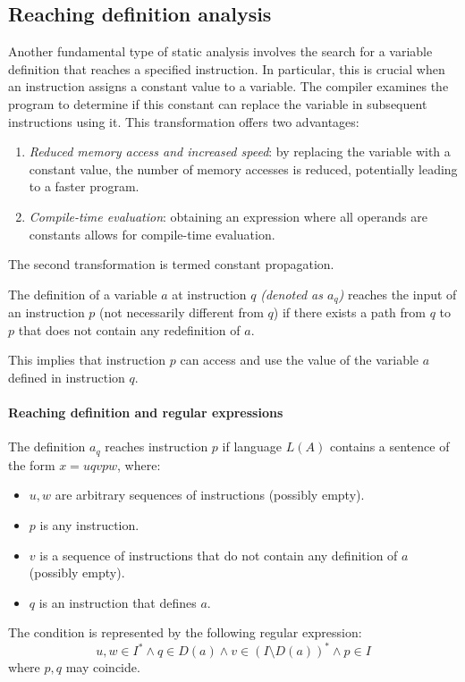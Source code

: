 \subsection{Reaching definition analysis}
Another fundamental type of static analysis involves the search for a variable definition that reaches a specified instruction. 
In particular, this is crucial when an instruction assigns a constant value to a variable. 
The compiler examines the program to determine if this constant can replace the variable in subsequent instructions using it. 
This transformation offers two advantages:
\begin{enumerate}
    \item \textit{Reduced memory access and increased speed}: by replacing the variable with a constant value, the number of memory accesses is reduced, potentially leading to a faster program.
    \item \textit{Compile-time evaluation}: obtaining an expression where all operands are constants allows for compile-time evaluation.
\end{enumerate}
The second transformation is termed constant propagation. 
\begin{definition}
    The definition of a variable $a$ at instruction $q$ \textit{(denoted as $a_q$)} reaches the input of an instruction $p$ (not necessarily different from $q$) if there exists a path from $q$ to $p$ that does not contain any redefinition of $a$.
\end{definition}
This implies that instruction $p$ can access and use the value of the variable $a$ defined in instruction $q$.

\paragraph*{Reaching definition and regular expressions}
The definition $a_q$ reaches instruction $p$ if language $L(A)$ contains a sentence of the form $x = u q v p w$, where:
\begin{itemize}
    \item $u, w$ are arbitrary sequences of instructions (possibly empty). 
    \item $p$ is any instruction.
    \item $v$ is a sequence of instructions that do not contain any definition of $a$ (possibly empty).
    \item $q$ is an instruction that defines $a$.
\end{itemize}
The condition is represented by the following regular expression:
\[ u, w \in I^{\ast} \land q \in D\left( a \right) \land v \in \left( I \setminus D \left( a \right)\right)^{\ast} \land p \in I \]
where $p, q$ may coincide.

